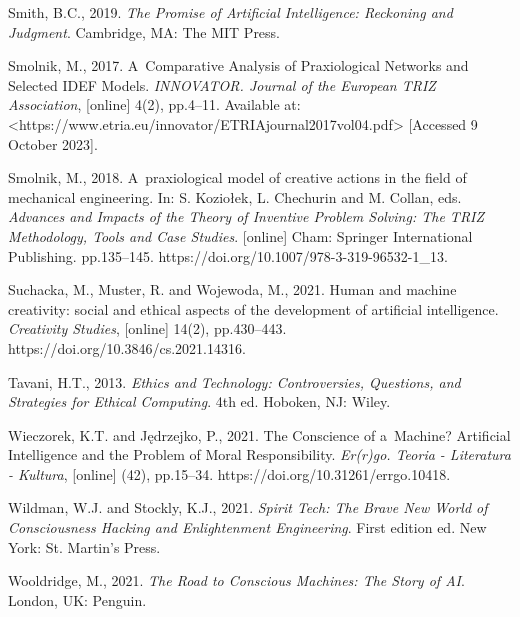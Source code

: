 Smith, B.C., 2019. \textit{The Promise of Artificial Intelligence: Reckoning and Judgment}. Cambridge, MA: The MIT Press.



Smolnik, M., 2017. A~Comparative Analysis of Praxiological Networks and Selected IDEF Models. \textit{INNOVATOR. Journal of the European TRIZ Association}, [online] 4(2), pp.4–11. Available at: {\textless}https://www.etria.eu/innovator/ETRIAjournal2017vol04.pdf{\textgreater} [Accessed 9 October 2023].



Smolnik, M., 2018. A~praxiological model of creative actions in the field of mechanical engineering. In: S. Koziołek, L. Chechurin and M. Collan, eds. \textit{Advances and Impacts of the Theory of Inventive Problem Solving: The TRIZ Methodology, Tools and Case Studies}. [online] Cham: Springer International Publishing. pp.135–145. https://doi.org/10.1007/978-3-319-96532-1\_13.



Suchacka, M., Muster, R. and Wojewoda, M., 2021. Human and machine creativity: social and ethical aspects of the development of artificial intelligence. \textit{Creativity Studies}, [online] 14(2), pp.430–443. https://doi.org/10.3846/cs.2021.14316.



Tavani, H.T., 2013. \textit{Ethics and Technology: Controversies, Questions, and Strategies for Ethical Computing}. 4th ed. Hoboken, NJ: Wiley.



Wieczorek, K.T. and Jędrzejko, P., 2021. The Conscience of a~Machine? Artificial Intelligence and the Problem of Moral Responsibility. \textit{Er(r)go. Teoria - Literatura - Kultura}, [online] (42), pp.15–34. https://doi.org/10.31261/errgo.10418.



Wildman, W.J. and Stockly, K.J., 2021. \textit{Spirit Tech: The Brave New World of Consciousness Hacking and Enlightenment Engineering}. First edition ed. New York: St. Martin's Press.



Wooldridge, M., 2021. \textit{The Road to Conscious Machines: The Story of AI}. London, UK: Penguin.



